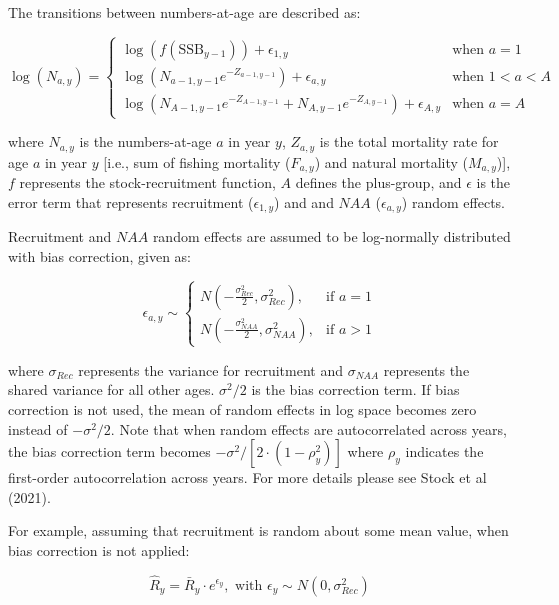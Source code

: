 \documentclass[
  12pt,
]{article}
\begin{document}
The transitions between numbers-at-age are described as:

\begin{equation}
\log(N_{a,y}) =
\begin{cases}
\log(f(\text{SSB}_{y-1})) + \epsilon_{1,y} & \text{when } a = 1 \\
\log(N_{a-1, y-1} e^{-Z_{a-1, y-1}}) + \epsilon_{a,y} & \text{when } 1 < a < A \\
\log(N_{A-1, y-1} e^{-Z_{A-1, y-1}} + N_{A, y-1} e^{-Z_{A, y-1}}) + \epsilon_{A,y} & \text{when } a = A
\end{cases}
\end{equation}

where \(N_{a,y}\) is the numbers-at-age \(a\) in year \(y\), \(Z_{a,y}\)
is the total mortality rate for age \(a\) in year \(y\) {[}i.e., sum of
fishing mortality (\(F_{a,y}\)) and natural mortality (\(M_{a,y}\)){]},
\(f\) represents the stock-recruitment function, \(A\) defines the
plus-group, and \(\epsilon\) is the error term that represents
recruitment (\(\epsilon_{1,y}\)) and and \(NAA\) (\(\epsilon_{a,y}\))
random effects.

Recruitment and \(NAA\) random effects are assumed to be log-normally
distributed with bias correction, given as:

\begin{equation}
\epsilon_{a,y} \sim 
\begin{cases} 
N\left(-\frac{\sigma_{Rec}^2}{2}, \sigma_{Rec}^2\right), & \text{if } a = 1 \\
N\left(-\frac{\sigma_{NAA}^2}{2}, \sigma_{NAA}^2\right), & \text{if } a > 1
\end{cases}
\end{equation}

where \(\sigma_{Rec}\) represents the variance for recruitment and
\(\sigma_{NAA}\) represents the shared variance for all other ages.
\(\sigma^2/2\) is the bias correction term. If bias correction is not
used, the mean of random effects in log space becomes zero instead of
\(-\sigma^2/2\). Note that when random effects are autocorrelated across
years, the bias correction term becomes
\(-\sigma^2 / [2 \cdot (1 - \rho_y^2)]\) where \(\rho_{y}\) indicates
the first-order autocorrelation across years. For more details please
see Stock et al (2021).

For example, assuming that recruitment is random about some mean value,
when bias correction is not applied:

\begin{equation}
\hat{R}_{y} = \bar{R}_{y} \cdot e^{\epsilon_{y}}, \text{ with } \epsilon_y \sim N(0, \sigma_{Rec}^2)
\end{equation}
\end{document}
